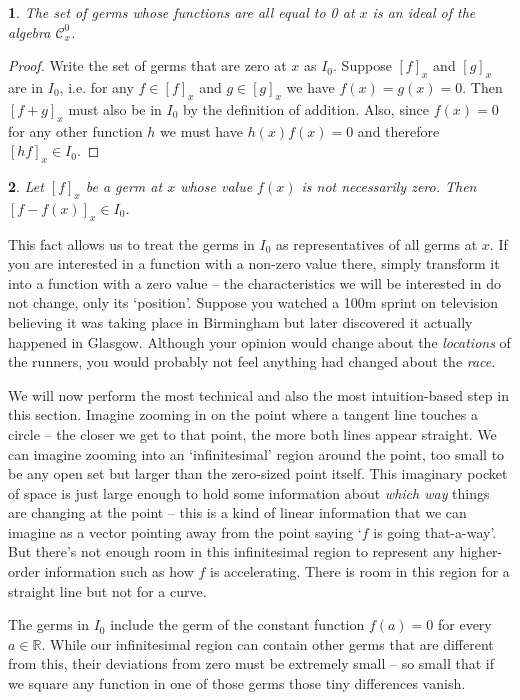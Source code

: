 \documentclass[oneside,english]{amsbook}
\numberwithin{section}{chapter}
\theoremstyle{plain}
\newtheorem{thm}{\protect\theoremname}
\theoremstyle{definition}
\providecommand{\theoremname}{Theorem}
\begin{document}
			\begin{thm}
				The set of germs whose functions are all equal to 0 at $x$ is an ideal of the algebra $\mathscr{C}^0_x$.
			\end{thm}
			
			\begin{proof}
				Write the set of germs that are zero at $x$ as $I_0$. Suppose $[f]_x$ and $[g]_x$ are in $I_0$, i.e. for any $f\in [f]_x$ and $g\in [g]_x$ we have $f(x) = g(x) = 0$. Then $[f + g]_x$ must also be in $I_0$ by the definition of addition. Also, since $f(x)=0$ for any other function $h$ we must have $h(x)f(x) = 0$ and therefore $[hf]_x\in I_0$. 
			\end{proof}
			
			\begin{thm}
				Let $[f]_x$ be a germ at $x$ whose value $f(x)$ is not necessarily zero. Then $[f - f(x)]_x \in I_0$.
			\end{thm}
							
			This fact allows us to treat the germs in $I_0$ as representatives of all germs at $x$. If you are interested in a function with a non-zero value there, simply transform it into a function with a zero value -- the characteristics we will be interested in do not change, only its `position'. Suppose you watched a 100m sprint on television believing it was taking place in Birmingham but later discovered it actually happened in Glasgow. Although your opinion would change about the \emph{locations} of the runners, you would probably not feel anything had changed about the \emph{race}.
			
			We will now perform the most technical and also the most intuition-based step in this section. Imagine zooming in on the point where a tangent line touches a circle -- the closer we get to that point, the more both lines appear straight. We can imagine zooming into an `infinitesimal' region around the point, too small to be any open set but larger than the zero-sized point itself. This imaginary pocket of space is just large enough to hold some information about \emph{which way} things are changing at the point -- this is a kind of linear information that we can imagine as a vector pointing away from the point saying `$f$ is going that-a-way'. But there's not enough room in this infinitesimal region to represent any higher-order information such as how $f$ is accelerating. There is room in this region for a straight line but not for a curve.
			
			The germs in $I_0$ include the germ of the constant function $f(a) = 0$ for every $a\in \mathbb{R}$. While our infinitesimal region can contain other germs that are different from this, their deviations from zero must be extremely small -- so small that if we square any function in one of those germs those tiny differences vanish. 
			
\end{document}
